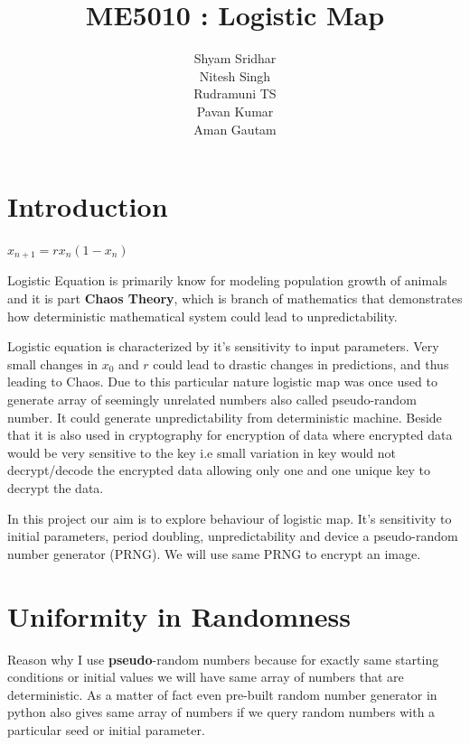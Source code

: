 \documentclass{report}
\title{\textbf{ME5010 : Logistic Map}}
\begin{document}
\author{Shyam Sridhar\\ Nitesh Singh \\ Rudramuni TS \\ Pavan Kumar \\ Aman Gautam }
\maketitle

\section{Introduction}
\raggedright

\begin{center}$x_{n+1} = rx_n(1-x_n)$\end{center}
Logistic Equation is primarily know for modeling population growth of animals and it is part \textbf{Chaos Theory}, which is branch of mathematics that demonstrates how deterministic mathematical system could lead to unpredictability.

Logistic equation is characterized by it's sensitivity to input parameters. Very small changes in $x_0$ and $r$ could lead to drastic changes in predictions, and thus leading to Chaos. Due to this particular nature logistic map was once used to generate array of seemingly unrelated numbers also called pseudo-random number. It could generate unpredictability from deterministic machine. Beside that it is also used in cryptography for encryption of data where encrypted data would be very sensitive to the key i.e small variation in key would not decrypt/decode the encrypted data allowing only one and one unique key to decrypt the data.

In this project our aim is to explore behaviour of logistic map. It's sensitivity to initial parameters, period doubling, unpredictability and device a pseudo-random number generator (PRNG). We will use same PRNG to encrypt an image.

\section{Uniformity in Randomness}
\raggedright

Reason why I use \textbf{pseudo}-random numbers because for exactly same starting conditions or initial values we will have same array of numbers that are deterministic. As a matter of fact even pre-built random number generator in python also gives same array of numbers if we query random numbers with a particular seed or initial parameter.
\end{document}
